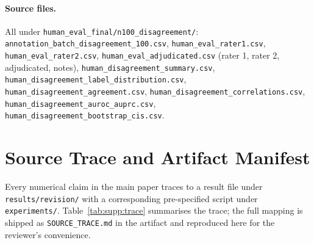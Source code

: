 \documentclass[11pt]{article}
\begin{document}
\paragraph{Source files.}
\begin{sloppypar}
All under \texttt{human\_eval\_final/n100\_disagreement/}:
\texttt{annotation\_batch\_disagreement\_100.csv},
\texttt{human\_eval\_rater1.csv},
\texttt{human\_eval\_rater2.csv},
\texttt{human\_eval\_adjudicated.csv} (rater 1, rater 2, adjudicated, notes),
\texttt{human\_disagreement\_summary.csv},
\texttt{human\_disagreement\_label\_distribution.csv},
\texttt{human\_disagreement\_agreement.csv},
\texttt{human\_disagreement\_correlations.csv},
\texttt{human\_disagreement\_auroc\_auprc.csv},
\texttt{human\_disagreement\_bootstrap\_cis.csv}.
\end{sloppypar}

\section{Source Trace and Artifact Manifest}
\label{supp:trace}

Every numerical claim in the main paper traces to a result file under
\texttt{results/revision/} with a corresponding pre-specified script
under \texttt{experiments/}. Table~\ref{tab:supp:trace} summarises the
trace; the full mapping is shipped as \texttt{SOURCE\_TRACE.md} in the
artifact and reproduced here for the reviewer's convenience.
\end{document}
